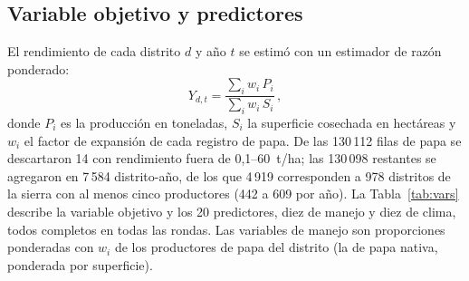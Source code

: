 \documentclass[conference,letterpaper]{IEEEtran}
\begin{document}
\subsection{Variable objetivo y predictores}
El rendimiento de cada distrito $d$ y año $t$ se estimó con un estimador de razón ponderado:
\begin{equation}
Y_{d,t}=\frac{\sum_{i} w_i\,P_i}{\sum_{i} w_i\,S_i}\,,
\end{equation}
donde $P_i$ es la producción en toneladas, $S_i$ la superficie cosechada en hectáreas y $w_i$ el factor de expansión de cada registro de papa. De las 130\,112 filas de papa se descartaron 14 con rendimiento fuera de 0,1--60~t/ha; las 130\,098 restantes se agregaron en 7\,584 distrito-año, de los que 4\,919 corresponden a 978 distritos de la sierra con al menos cinco productores (442 a 609 por año). La Tabla~\ref{tab:vars} describe la variable objetivo y los 20 predictores, diez de manejo y diez de clima, todos completos en todas las rondas. Las variables de manejo son proporciones ponderadas con $w_i$ de los productores de papa del distrito (la de papa nativa, ponderada por superficie).
\end{document}
